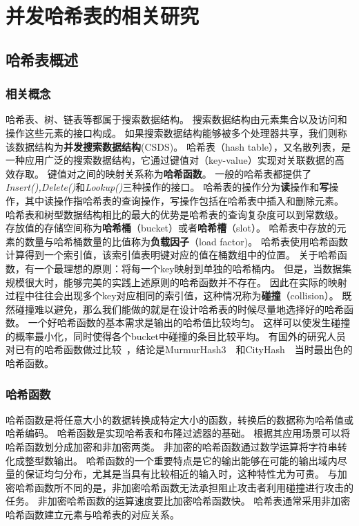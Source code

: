 \chapter{并发哈希表的相关研究}


\section{哈希表概述}

\subsection{相关概念}

哈希表、树、链表等都属于搜索数据结构。
搜索数据结构由元素集合以及访问和操作这些元素的接口构成。
如果搜索数据结构能够被多个处理器共享，我们则称该数据结构为\textbf{并发搜索数据结构}(CSDS)。
哈希表（hash table），又名散列表，是一种应用广泛的搜索数据结构，它通过键值对（key-value）实现对关联数据的高效存取。
键值对之间的映射关系称为\textbf{哈希函数}。
一般的哈希表都提供了\textit{Insert(),Delete()}和\textit{Lookup()}三种操作的接口。
哈希表的操作分为\textbf{读}操作和\textbf{写}操作，其中读操作指哈希表的查询操作，写操作包括在哈希表中插入和删除元素。
哈希表和树型数据结构相比的最大的优势是哈希表的查询复杂度可以到常数级。
存放值的存储空间称为\textbf{哈希桶}（bucket）或者\textbf{哈希槽}（slot）。
哈希表中存放的元素的数量与哈希桶数量的比值称为\textbf{负载因子}（load factor)。
哈希表使用哈希函数计算得到一个索引值，该索引值表明键对应的值在桶数组中的位置。
关于哈希函数，有一个最理想的原则：将每一个key映射到单独的哈希桶内。
但是，当数据集规模很大时，能够完美的实践上述原则的哈希函数并不存在。
因此在实际的映射过程中往往会出现多个key对应相同的索引值，这种情况称为\textbf{碰撞}（collision）。
既然碰撞难以避免，那么我们能做的就是在设计哈希表的时候尽量地选择好的哈希函数。
一个好哈希函数的基本需求是输出的哈希值比较均匀。
这样可以使发生碰撞的概率最小化，同时使得各个bucket中碰撞的条目比较平均。
有国外的研究人员对已有的哈希函数做过比较~\cite{Josh2012}，结论是MurmurHash3~\cite{Murmurhash}~和CityHash~\cite{cityhash}~当时最出色的哈希函数。

\subsection{哈希函数}
哈希函数是将任意大小的数据转换成特定大小的函数，转换后的数据称为哈希值或哈希编码。
哈希函数是实现哈希表和布隆过滤器的基础。
根据其应用场景可以将哈希函数划分成加密和非加密两类。
非加密的哈希函数通过数学运算将字符串转化成整型数输出。
哈希函数的一个重要特点是它的输出能够在可能的输出域内尽量的保证均匀分布，尤其是当具有比较相近的输入时，这种特性尤为可贵。
与加密哈希函数所不同的是，非加密哈希函数无法承担阻止攻击者利用碰撞进行攻击的任务。
非加密哈希函数的运算速度要比加密哈希函数快。
哈希表通常采用非加密哈希函数建立元素与哈希表的对应关系。

